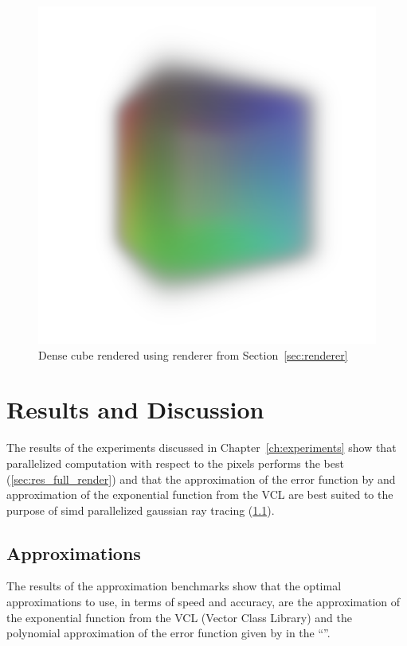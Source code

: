 \documentclass[a4paper, 11pt]{memoir}
\begin{document}
    \begin{figure}[t]
        \centering
        \includegraphics[scale=.2]{images/cube.png}
        \caption{Dense cube rendered using renderer from Section~\ref{sec:renderer}}
        \label{fig:cube_render}
    \end{figure}
    
    \chapter{Results and Discussion}
    \label{ch:results}

    The results of the experiments discussed in Chapter~\ref{ch:experiments} show that parallelized computation with
    respect to the pixels performs the best (\ref{sec:res_full_render}) and that the approximation of the error function
    by \citeauthor{AbraSteg72} and approximation of the exponential function from the VCL are best suited to the purpose
    of \gls{simd} parallelized gaussian ray tracing (\ref{sec:res_approx}).

    \section{Approximations}
    \label{sec:res_approx}
    The results of the approximation benchmarks show that the optimal approximations to use, in terms of speed and
    accuracy, are the approximation of the exponential function from the VCL (Vector Class Library) and the polynomial
    approximation of the error function given by \citeauthor{AbraSteg72} in the \enquote{}.
\end{document}
